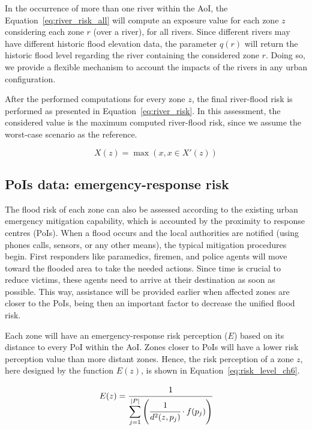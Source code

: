 \begin{refsection}
In the occurrence of more than one river within the AoI, the Equation~\ref{eq:river_risk_all} will compute an exposure value for each zone $z$ considering each zone $r$ (over a river), for all rivers. Since different rivers may have different historic flood elevation data, the parameter $q(r)$ will return the historic flood level regarding the river containing the considered zone $r$. Doing so, we provide a flexible mechanism to account the impacts of the rivers in any urban configuration. 

After the performed computations for every zone $z$, the final river-flood risk is performed as presented in Equation~\ref{eq:river_risk}. In this assessment, the considered value is the maximum computed river-flood risk, since we assume the worst-case scenario as the reference.

\begin{equation}
  \label{eq:river_risk}
  X(z) = \max({x, x \in X'(z)})
\end{equation}

\subsection{PoIs data: emergency-response risk}

The flood risk of each zone can also be assessed according to the existing urban emergency mitigation capability, which is accounted by the proximity to response centres (PoIs). When a flood occurs and the local authorities are notified (using phones calls, sensors, or any other means), the typical mitigation procedures begin. First responders like paramedics, firemen, and police agents will move toward the flooded area to take the needed actions. Since time is crucial to reduce victims, these agents need to arrive at their destination as soon as possible. This way, assistance will be provided earlier when affected zones are closer to the PoIs, being then an important factor to decrease the unified flood risk.

Each zone will have an emergency-response risk perception ($E$) based on its distance to every PoI within the AoI. Zones closer to PoIs will have a lower risk perception value than more distant zones. Hence, the risk perception of a zone $z$, here designed by the function $E(z)$, is shown in Equation~\ref{eq:risk_level_ch6}.

\begin{equation}
  \label{eq:risk_level_ch6}
  E(z) = \cfrac{1}{\displaystyle\sum_{j = 1}^{\lvert P \rvert}\left(\cfrac{1}{d^2(z, p_j)} \cdot f(p_j)\right)} 
\end{equation}


\end{refsection}
